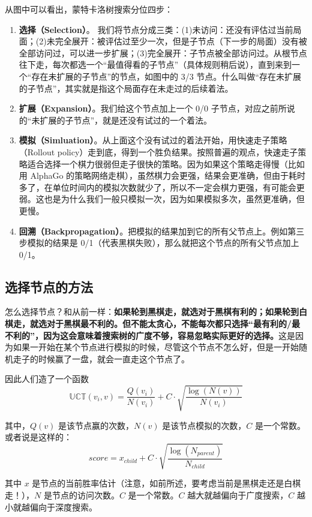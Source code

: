 \documentclass[12pt]{article}
\begin{document}
从图中可以看出，蒙特卡洛树搜索分位四步：
\begin{enumerate}
\setlength{\itemsep}{0pt}
\setlength{\parsep}{0pt}
\setlength{\parskip}{0pt}
    \item \textbf{选择（Selection）}。  我们将节点分成三类：(1)未访问：还没有评估过当前局面；(2)未完全展开：被评估过至少一次，但是子节点（下一步的局面）没有被全部访问过，可以进一步扩展；(3)完全展开：子节点被全部访问过。从根节点往下走，每次都选一个“最值得看的子节点”（具体规则稍后说），直到来到一个“存在未扩展的子节点”的节点，如图中的 3/3 节点。什么叫做“存在未扩展的子节点”，其实就是指这个局面存在未走过的后续着法。
    \item \textbf{扩展（Expansion）}。我们给这个节点加上一个 0/0 子节点，对应之前所说的“未扩展的子节点”，就是还没有试过的一个着法。
    \item \textbf{模拟（Simluation）}。从上面这个没有试过的着法开始，用快速走子策略（Rollout policy）走到底，得到一个胜负结果。按照普遍的观点，快速走子策略适合选择一个棋力很弱但走子很快的策略。因为如果这个策略走得慢（比如用 AlphaGo 的策略网络走棋），虽然棋力会更强，结果会更准确，但由于耗时多了，在单位时间内的模拟次数就少了，所以不一定会棋力更强，有可能会更弱。这也是为什么我们一般只模拟一次，因为如果模拟多次，虽然更准确，但更慢。
    \item \textbf{回溯（Backpropagation）}。把模拟的结果加到它的所有父节点上。例如第三步模拟的结果是 0/1（代表黑棋失败），那么就把这个节点的所有父节点加上 0/1。
\end{enumerate}

\subsection{选择节点的方法}
怎么选择节点？和从前一样：\textbf{如果轮到黑棋走，就选对于黑棋有利的；如果轮到白棋走，就选对于黑棋最不利的。但不能太贪心，不能每次都只选择“最有利的/最不利的”，因为这会意味着搜索树的广度不够，容易忽略实际更好的选择。}这是因为如果一开始在某个节点进行模拟的时候，尽管这个节点不怎么好，但是一开始随机走子的时候赢了一盘，就会一直走这个节点了。

因此人们造了一个函数
$$
\mathbb{UCT}(v_i, v)  = \frac{Q(v_i)}{N(v_i)} + C \cdot \sqrt{\frac{\log(N(v))}{N(v_i)}}
$$

其中，$Q(v)$ 是该节点赢的次数，$N(v)$ 是该节点模拟的次数，$C$ 是一个常数。或者说是这样的：
$$
score = x_{child} + C \cdot \sqrt{\frac{\log(N_{parent})}{N_{child}}}
$$

其中 $x$ 是节点的当前胜率估计（注意，如前所述，要考虑当前是黑棋走还是白棋走！），$N$ 是节点的访问次数。$C$ 是一个常数。$C$ 越大就越偏向于广度搜索，$C$ 越小就越偏向于深度搜索。
\end{document}
